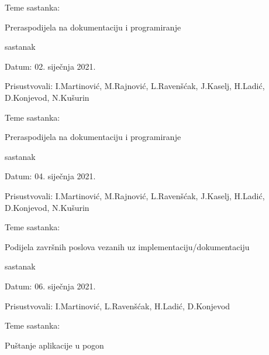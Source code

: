 \begin{packed_enum}
\begin{packed_item}
				\item Teme sastanka: 
				\begin{packed_item}
					\item   Preraspodijela na dokumentaciju i programiranje
				\end{packed_item}
			\end{packed_item}
				\item sastanak
				\item[] \begin{packed_item}
					\item Datum: 02. siječnja 2021.
					\item Prisustvovali: I.Martinović, M.Rajnović, L.Ravenšćak, J.Kaselj, H.Ladić, D.Konjevod, N.Kušurin
					\item Teme sastanka: 
					\begin{packed_item}
						\item   Preraspodijela na dokumentaciju i programiranje
					\end{packed_item}
				\end{packed_item}
			\item sastanak
			\item[] \begin{packed_item}
				\item Datum: 04. siječnja 2021.
				\item Prisustvovali: I.Martinović, M.Rajnović, L.Ravenšćak, J.Kaselj, H.Ladić, D.Konjevod, N.Kušurin
				\item Teme sastanka: 
				\begin{packed_item}
					\item  Podijela završnih poslova vezanih uz implementaciju/dokumentaciju
				\end{packed_item}
			\end{packed_item}
		\item sastanak
		\item[] \begin{packed_item}
			\item Datum: 06. siječnja 2021.
			\item Prisustvovali: I.Martinović,  L.Ravenšćak,  H.Ladić, D.Konjevod
			\item Teme sastanka: 
			\begin{packed_item}
				\item   Puštanje aplikacije u pogon
			\end{packed_item}
		\end{packed_item}
\item[] \begin{packed_item}

\end{packed_item}
\end{packed_enum}
